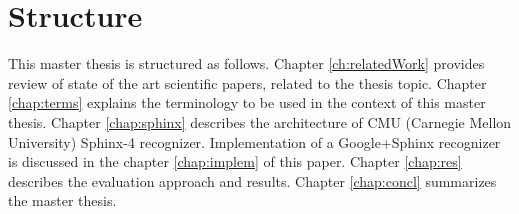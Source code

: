 \section {Structure}
This master thesis is structured as follows. Chapter \ref{ch:relatedWork}
provides review of state of the art scientific papers, related to the thesis
topic. Chapter \ref{chap:terms} explains the terminology to be used in the
context of this master thesis.  Chapter \ref{chap:sphinx} describes the
architecture of CMU (Carnegie Mellon University) Sphinx-4 recognizer.
Implementation of a Google+Sphinx recognizer is discussed in the chapter \ref{chap:implem} of this paper. Chapter \ref{chap:res} describes the
evaluation approach and results. Chapter \ref{chap:concl} summarizes the master
thesis.
